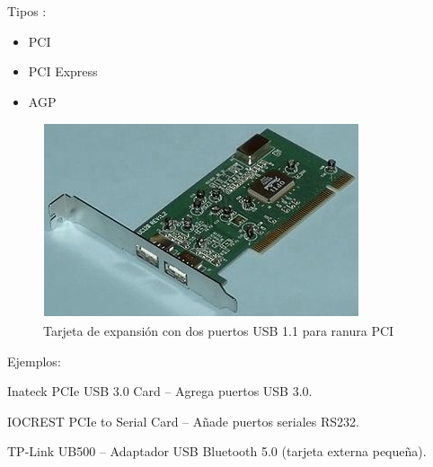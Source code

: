 Tipos \cite{josito}:

\begin{itemize}
  \item PCI
  \item PCI Express
  \item AGP
\end{itemize}

\begin{figure}[H]
  \centering
  \includegraphics[scale=0.9]{imagenes/tarjeta-expansion.png}
  \caption{Tarjeta de expansión con dos puertos USB 1.1 para ranura PCI}
\end{figure}

Ejemplos:

Inateck PCIe USB 3.0 Card – Agrega puertos USB 3.0.

IOCREST PCIe to Serial Card – Añade puertos seriales RS232.

TP-Link UB500 – Adaptador USB Bluetooth 5.0 (tarjeta externa pequeña).
